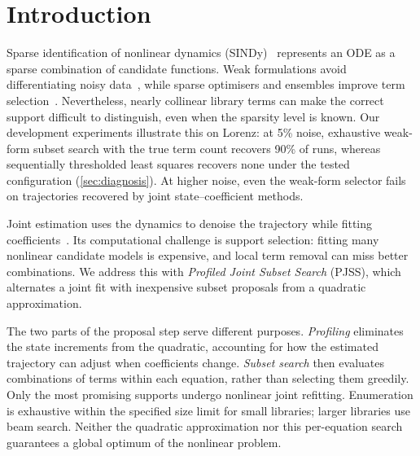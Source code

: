\section{Introduction}
\label{sec:intro}

Sparse identification of nonlinear dynamics (SINDy)~\citep{brunton2016sindy} represents an ODE as a sparse combination of candidate functions. Weak formulations avoid differentiating noisy data~\citep{messenger2021wsindy,schaeffer2017integral}, while sparse optimisers and ensembles improve term selection~\citep{champion2020sr3,bertsimas2023miosr,fasel2022esindy}. Nevertheless, nearly collinear library terms can make the correct support difficult to distinguish, even when the sparsity level is known. Our development experiments illustrate this on Lorenz: at 5\% noise, exhaustive weak-form subset search with the true term count recovers 90\% of runs, whereas sequentially thresholded least squares recovers none under the tested configuration (\cref{sec:diagnosis}). At higher noise, even the weak-form selector fails on trajectories recovered by joint state--coefficient methods.

Joint estimation uses the dynamics to denoise the trajectory while fitting coefficients~\citep{ramsay2007parameter,rudy2019deep,kaheman2022autodiff,meissner2024dedi,fung2025odrbindy}. Its computational challenge is support selection: fitting many nonlinear candidate models is expensive, and local term removal can miss better combinations. We address this with \emph{Profiled Joint Subset Search} (PJSS), which alternates a joint fit with inexpensive subset proposals from a quadratic approximation.

The two parts of the proposal step serve different purposes. \emph{Profiling} eliminates the state increments from the quadratic, accounting for how the estimated trajectory can adjust when coefficients change. \emph{Subset search} then evaluates combinations of terms within each equation, rather than selecting them greedily. Only the most promising supports undergo nonlinear joint refitting. Enumeration is exhaustive within the specified size limit for small libraries; larger libraries use beam search. Neither the quadratic approximation nor this per-equation search guarantees a global optimum of the nonlinear problem.

